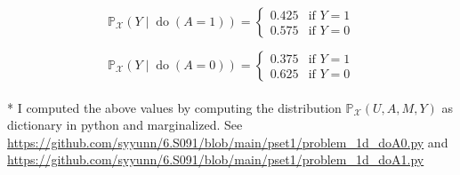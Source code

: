 \documentclass[10pt]{article}
\begin{document}
\begin{equation}
    \mathbb{P}_{\mathcal{X}}(Y \mid \operatorname{do}(A=1))=
    \begin{cases}
        0.425 & \text{if $Y=1$} \\
        0.575 & \text{if $Y=0$}
    \end{cases}
  \end{equation}

  \begin{equation}
    \mathbb{P}_{\mathcal{X}}(Y \mid \operatorname{do}(A=0))=
    \begin{cases}
        0.375 & \text{if $Y=1$} \\
        0.625 & \text{if $Y=0$}
    \end{cases}
  \end{equation}
\\
* I computed the above values by computing the distribution $\mathbb{P}_{\mathcal{X}}(U, A, M, Y)$ as dictionary in python and marginalized. 
See \url{https://github.com/syyunn/6.S091/blob/main/pset1/problem_1d_doA0.py} and \url{https://github.com/syyunn/6.S091/blob/main/pset1/problem_1d_doA1.py} 
\end{document}

